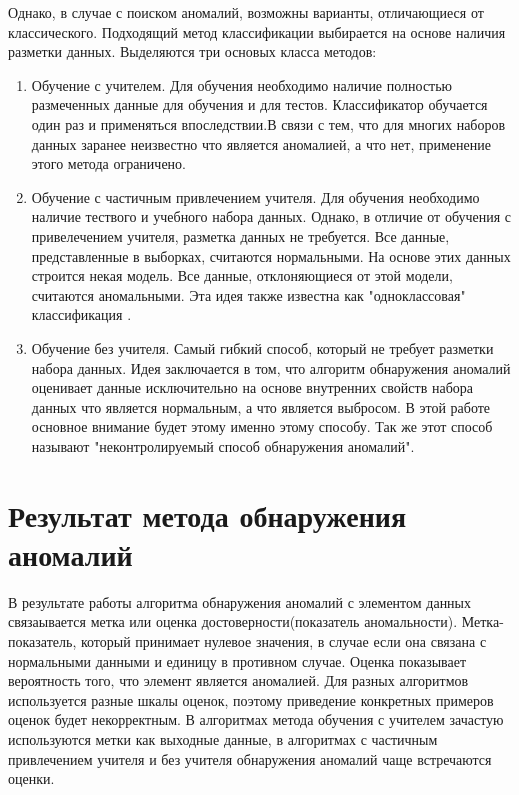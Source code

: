  Однако, в случае с поиском аномалий, возможны варианты, отличающиеся от классического. Подходящий метод классификации выбирается на основе наличия разметки данных.   Выделяются три основых класса методов:
\begin{enumerate}
\item Обучение с учителем. Для обучения необходимо наличие полностью  размеченных данные для обучения и для тестов. Классификатор  обучается один раз и применяться впоследствии.В связи с тем, что для многих наборов данных заранее неизвестно что является аномалией, а что нет, применение этого метода ограничено.
\item Обучение с частичным привлечением учителя. Для обучения необходимо наличие тествого и учебного набора данных. Однако, в отличие от обучения с привелечением учителя, разметка данных не требуется. Все данные, представленные в выборках, считаются нормальными. На основе этих данных строится некая модель. Все данные, отклоняющиеся от этой модели, считаются аномальными. Эта идея также известна как "одноклассовая" классификация \cite{Book03}.
\item Обучение без учителя.
Самый гибкий способ, который не требует разметки набора данных.  Идея заключается в том, что алгоритм обнаружения аномалий оценивает данные исключительно на основе внутренних свойств набора данных что является нормальным, а что является выбросом. В этой работе основное внимание будет этому  именно этому способу. Так же этот способ называют "неконтролируемый способ обнаружения  аномалий".
\end{enumerate}

\section{Результат метода обнаружения аномалий}
В результате работы алгоритма обнаружения аномалий  с элементом данных связаывается  метка или оценка достоверности(показатель аномальности).  Метка- показатель, который принимает нулевое значения, в случае если она связана с нормальными данными и единицу в противном случае. Оценка показывает вероятность того, что элемент является аномалией. Для разных алгоритмов используется разные шкалы оценок, поэтому приведение конкретных примеров оценок будет некорректным.  В алгоритмах метода обучения с учителем зачастую используются метки как выходные данные, в  алгоритмах  с частичным привлечением учителя и без учителя  обнаружения аномалий чаще встречаются оценки.
